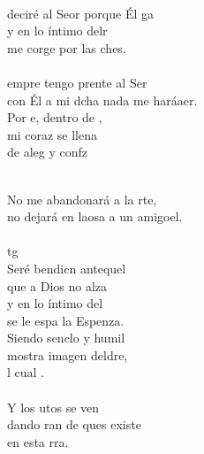 \begin{cancion}%
	    \\
	deciré al Seor porque Él ga \\
	y en lo íntimo delr \\
	me corge por las ches.\\
\jump\\
	empre tengo prente al Ser\\
	con Él a mi dcha nada me haráaer.\\
	Por e, dentro de ,  \\
	mi coraz se llena \\
	de aleg y confz\\\jump\\
	\begin{chorus}%
	No me abandonará a la rte,\\
	no dejará en laosa a un amigoel.\\
\jump\\
	tg     \\
	Seré bendicn antequel \\
	que a Dios no alza \\
	y en lo íntimo del \\
	se le espa la Espenza.\\
	Siendo senclo y humil \\
	mostra  imagen deldre, \\
	l cual .\\
\jump\\
	Y los utos se ven  \\
	dando ran de ques existe \\
	en esta rra.\\

\end{chorus}
\end{cancion}
